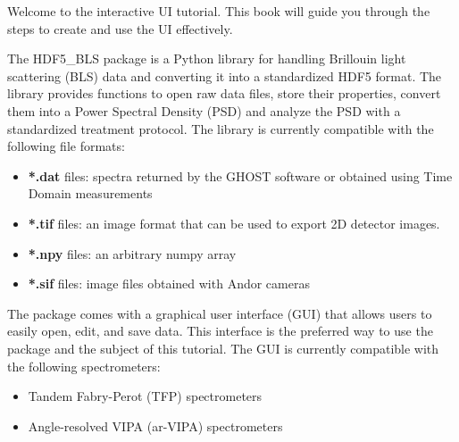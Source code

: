 Welcome to the interactive UI tutorial. This book will guide you through the steps to create and use the UI effectively.

The HDF5\_BLS package is a Python library for handling Brillouin light scattering (BLS) data and converting it into a standardized HDF5 format. The library provides functions to open raw data files, store their properties, convert them into a Power Spectral Density (PSD) and analyze the PSD with a standardized treatment protocol. The library is currently compatible with the following file formats:
\begin{itemize}
    \item \textbf{*.dat} files: spectra returned by the GHOST software or obtained using Time Domain measurements
    \item \textbf{*.tif} files: an image format that can be used to export 2D detector images.
    \item \textbf{*.npy} files: an arbitrary numpy array
    \item \textbf{*.sif} files: image files obtained with Andor cameras
\end{itemize}

The package comes with a graphical user interface (GUI) that allows users to easily open, edit, and save data. This interface is the preferred way to use the package and the subject of this tutorial. The GUI is currently compatible with the following spectrometers:
\begin{itemize}
    \item Tandem Fabry-Perot (TFP) spectrometers
    \item Angle-resolved VIPA (ar-VIPA) spectrometers 
\end{itemize}